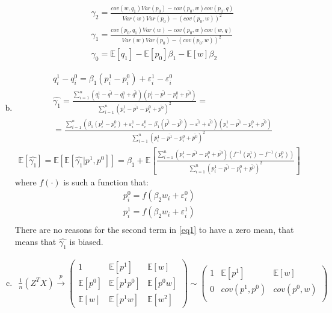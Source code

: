 \documentclass[a4paper]{article}
\newcommand{\expect}{\mathbb{E}}
\newcommand{\summa}{\sum_{i=1}^n}
\begin{document}
\begin{enumerate}[(a)]
	\begin{align*}
	&\gamma_2 = \frac{cov(w, q_1)Var(p_0) - cov(p_0, w)cov(p_0, q)}{Var(w)Var(p_0) - (cov(p_0, w))^2}\\
	&\gamma_1 = \frac{cov(p_0, q_1)Var(w) - cov(p_0, w)cov(w, q)}{Var(w)Var(p_0) - (cov(p_0, w))^2}\\
	&\gamma_0 = \expect[q_1] - \expect[p_0] \beta_1 - \expect[w]\beta_2
	\end{align*}
	\item 
	\begin{align*}
	&q_i^1 - q_i^0 = \beta_1(p_i^1 - p_i^0) + \varepsilon_i^1 - \varepsilon_i^0\\
	&\hat{\gamma_1} = \frac{\summa (q^1_i - \bar{q^1} - q^0_i + \bar{q^0})(p^1_i - \bar{p^1} - p^0_i + \bar{p^0})}{\summa (p^1_i - \bar{p^1} - p^0_i + \bar{p^0})^2} = \\
	&= \frac{\summa (\beta_1(p_i^1 - p_i^0) + \varepsilon_i^1 - \varepsilon^0_i - \beta_1(\bar{p^1} - \bar{p^0}) - \bar{\varepsilon^1} + \bar{\varepsilon^0})(p^1_i - \bar{p^1} - p^0_i + \bar{p^0})}{\summa (p^1_i - \bar{p^1} - p^0_i + \bar{p^0})^2}
	\end{align*}
	\begin{align}\label{eq1}
	\expect[\hat{\gamma_1}] = \expect[\expect[\hat{\gamma_1}|p^1, p^0]] = \beta_1 +  \expect\left[\frac{\summa (p^1_i - \bar{p^1} - p^0_i + \bar{p^0})(f^{-1}(p^1_i) - f^{-1}(p^0_i))}{\summa (p^1_i - \bar{p^1} - p^0_i + \bar{p^0})^2}\right]
	\end{align}
	where $f(\cdot)$ is such a function that:
	\begin{align*}
	p^0_i = f(\beta_2 w_i + \varepsilon^0_i)\\
	p^1_i = f(\beta_2 w_i + \varepsilon^1_i)\\
	\end{align*}
	There are no reasons for the second term in \eqref{eq1} to have a zero mean, that means that $\hat{\gamma_1}$ is biased.
	\item 
	\begin{align}\label{eq2}
	\frac{1}{n}(Z^TX) \overset{p}{\to} \begin{pmatrix}
	1 & \expect[p^1] & \expect[w]\\
	\expect[p^0] & \expect[p^1p^0] & \expect[p^0w]\\
	\expect[w] & \expect[p^1w] & \expect[w^2]
	\end{pmatrix} \sim \begin{pmatrix}
	1 & \expect[p^1] & \expect[w]\\
	0 & cov(p^1, p^0) & cov(p^0, w)\\

\end{pmatrix}
\end{align}
\end{enumerate}
\end{document}
